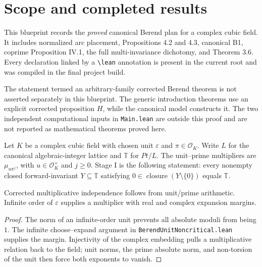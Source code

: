 \section{Scope and completed results}

This blueprint records the \emph{proved} canonical Berend plan for a complex
cubic field. It includes normalized arc placement, Propositions 4.2 and 4.3,
canonical B1, coprime Proposition IV.1, the full multi-invariance dichotomy,
and Theorem 3.6. Every declaration linked by a \texttt{\textbackslash lean}
annotation is present in the current root and was compiled in the final project
build.

The statement termed an arbitrary-family corrected Berend theorem is not asserted
separately in this blueprint. The generic introduction theorems use an explicit
corrected proposition \(H\), while the canonical model constructs it. The two
independent computational inputs in \texttt{Main.lean} are outside this proof
and are not reported as mathematical theorems proved here.

\begin{definition}
  \label{def:unit-prime-residual}
  \leanok
  Let \(K\) be a complex cubic field with chosen unit \(\varepsilon\) and
  \(\pi\in\mathcal O_K\). Write \(L\) for the canonical algebraic-integer
  lattice and \(\mathbb T\) for \(Pt/L\). The unit--prime multipliers are
  \(\mu_{u\pi^j}\), with \(u\in\mathcal O_K^\times\) and \(j\geq0\).
  Stage I is the following statement: every nonempty closed forward-invariant
  \(Y\subseteq\mathbb T\) satisfying
  \(0\in\operatorname{closure}(Y\setminus\{0\})\) equals \(\mathbb T\).
\end{definition}

\begin{lemma}
  \label{lem:unit-prime-independence}
  \leanok
  Corrected multiplicative independence follows from unit/prime arithmetic.
  Infinite order of \(\varepsilon\) supplies a multiplier with real and
  complex expansion margins.
\end{lemma}
\begin{proof}
  The norm of an infinite-order unit prevents all absolute moduli from being
  \(1\).  The infinite choose--expand argument in
  \texttt{BerendUnitNoncritical.lean} supplies the margin.
  Injectivity of the complex embedding pulls a multiplicative relation back to
  the field; unit norms, the prime absolute norm, and non-torsion of the unit
  then force both exponents to vanish.
\end{proof}

